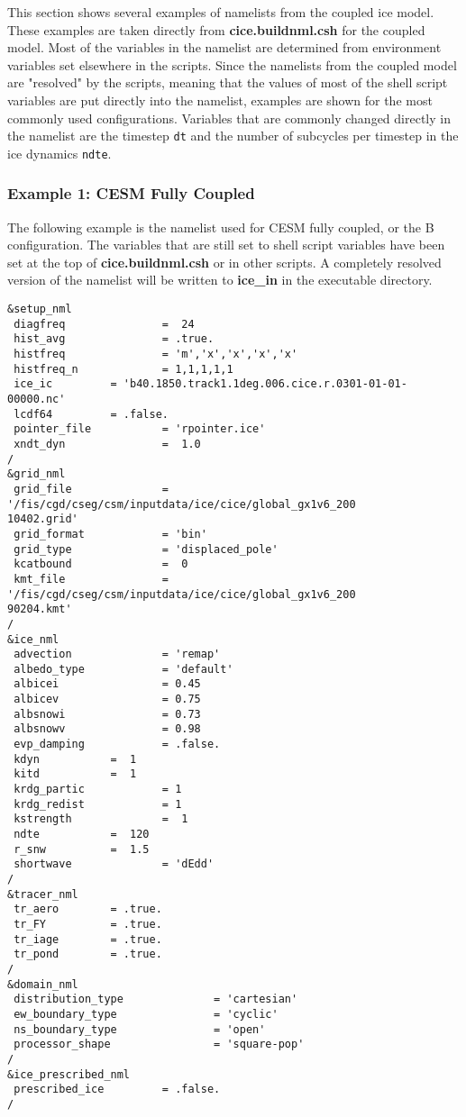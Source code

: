 
This section shows several examples of namelists from the coupled
ice model.  These examples are taken directly from {\bf cice.buildnml.csh}
for the coupled model.  
Most of the variables in the namelist are determined from environment variables
set elsewhere in the scripts. Since the namelists from the coupled model are
"resolved" by the scripts, meaning that the values of most of the shell script
variables are put directly into the namelist, examples are shown for the most
commonly used configurations.  Variables that are commonly changed directly in
the namelist are the timestep {\tt dt} and the number of subcycles per timestep
in the ice dynamics {\tt ndte}. 

\subsubsection {Example 1: CESM Fully Coupled}
\label{example1_nml}

The following example is the namelist used for CESM fully coupled, or
the B configuration.  The variables that are still set to shell script
variables have been set at the top of {\bf cice.buildnml.csh}
or in other scripts.  A completely resolved version of the namelist will
be written to {\bf ice\_in} in the executable directory.

\begin{verbatim}
&setup_nml
 diagfreq               =  24   
 hist_avg               = .true.  
 histfreq               = 'm','x','x','x','x'
 histfreq_n             = 1,1,1,1,1           
 ice_ic         = 'b40.1850.track1.1deg.006.cice.r.0301-01-01-00000.nc'
 lcdf64         = .false. 
 pointer_file           = 'rpointer.ice'
 xndt_dyn               =  1.0 
/
&grid_nml
 grid_file              = '/fis/cgd/cseg/csm/inputdata/ice/cice/global_gx1v6_200
10402.grid'
 grid_format            = 'bin'
 grid_type              = 'displaced_pole'
 kcatbound              =  0 
 kmt_file               = '/fis/cgd/cseg/csm/inputdata/ice/cice/global_gx1v6_200
90204.kmt'
/
&ice_nml
 advection              = 'remap'
 albedo_type            = 'default'
 albicei                = 0.45
 albicev                = 0.75
 albsnowi               = 0.73
 albsnowv               = 0.98
 evp_damping            = .false.
 kdyn           =  1 
 kitd           =  1 
 krdg_partic            = 1
 krdg_redist            = 1
 kstrength              =  1 
 ndte           =  120 
 r_snw          =  1.5 
 shortwave              = 'dEdd'
/
&tracer_nml
 tr_aero        = .true.
 tr_FY          = .true.
 tr_iage        = .true.
 tr_pond        = .true.
/
&domain_nml
 distribution_type              = 'cartesian'
 ew_boundary_type               = 'cyclic'
 ns_boundary_type               = 'open'
 processor_shape                = 'square-pop'
/
&ice_prescribed_nml
 prescribed_ice         = .false.
/
\end{verbatim}

